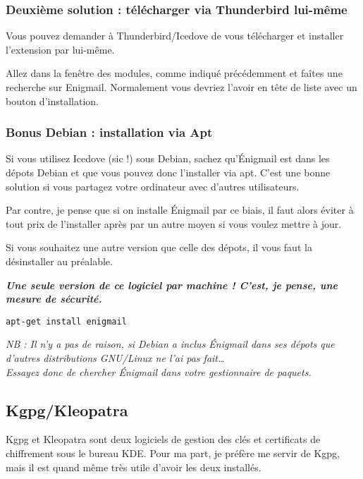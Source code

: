 \subsubsection{Deuxième solution : télécharger via Thunderbird lui-même}\label{deuxiuxe8me-solution-tuxe9luxe9charger-via-thunderbird-lui-muxeame}

Vous pouvez demander à Thunderbird/Icedove de vous télécharger et
installer l'extension par lui-même.

Allez dans la fenêtre des modules, comme indiqué précédemment et faîtes
une recherche sur Enigmail. Normalement vous devriez l'avoir en tête de
liste avec un bouton d'installation.

\subsubsection{Bonus Debian : installation via Apt}\label{bonus-debian-installation-via-apt}

Si vous utilisez Icedove (sic !) sous Debian, sachez qu'Énigmail est
dans les dépots Debian et que vous pouvez donc l'installer via apt.
C'est une bonne solution si vous partagez votre ordinateur avec d'autres
utilisateurs.

Par contre, je pense que si on installe Énigmail par ce biais, il faut
alors éviter à tout prix de l'installer après par un autre moyen si vous
voulez mettre à jour.

Si vous souhaitez une autre version que celle des dépots, il vous faut
la désinstaller au préalable.

\textbf{\emph{Une seule version de ce logiciel par machine ! C'est, je
pense, une mesure de sécurité.}}

\begin{verbatim}
apt-get install enigmail
\end{verbatim}

\emph{NB : Il n'y a pas de raison, si Debian a inclus Énigmail dans ses
dépots que d'autres distributions GNU/Linux ne l'ai pas
fait\ldots{}\\Essayez donc de chercher Énigmail dans votre gestionnaire
de paquets.}

\subsection{Kgpg/Kleopatra}\label{kgpgkleopatra}

Kgpg et Kleopatra sont deux logiciels de gestion des clés et certificats
de chiffrement sous le bureau KDE. Pour ma part, je préfère me servir de
Kgpg, mais il est quand même très utile d'avoir les deux installés.

